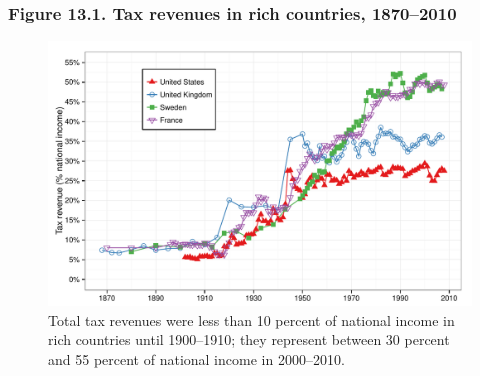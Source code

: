 \documentclass[t]{beamer}\usepackage[]{graphicx}\usepackage[]{color}
\newenvironment{knitrout}{}{} %
\begin{document}
\begin{frame}[label=Figure_13_1]
\frametitle{Figure 13.1. Tax revenues in rich countries, 1870--2010}
\begin{figure}[t]
\begin{minipage}[b]{\textwidth}
\centering
\begin{knitrout}\footnotesize
{}\color{fgcolor}

{\centering \includegraphics[width=1\linewidth]{figures/color/Figure_13_1} 

}



\end{knitrout}
\caption{Total tax revenues were less than 10 percent of national income in rich countries until 1900--1910; they represent between 30 percent and 55 percent of national income in 2000--2010.}
\end{minipage}
\end{figure}
\end{frame}
\end{document}
